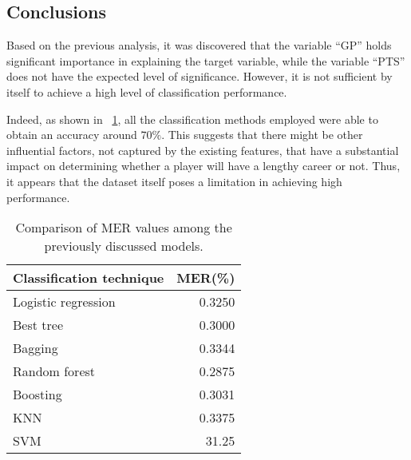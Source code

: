 \subsection{Conclusions}

Based on the previous analysis, it was discovered that the variable ``GP'' holds significant importance in explaining the target variable, while the variable ``PTS'' does not have the expected level of significance. 
However, it is not sufficient by itself to achieve a high level of classification performance.

Indeed, as shown in \Tab~\ref{table:ClasEvalParams}, all the classification methods employed were able to obtain an accuracy around $70\%$. This suggests that there might be other influential factors, not captured by the existing features, that have a substantial impact on determining whether a player will have a lengthy career or not. Thus, it appears that the dataset itself poses a limitation in achieving high performance.

\begin{table}[H]
	\centering
	\begin{tabular}{|| l | r ||} 
		\hline
		Classification technique & MER(\%) \\
		\hline
		Logistic regression & 0.3250 \\
		\hline
		Best tree & 0.3000 \\
		\hline
		Bagging & 0.3344 \\
		\hline
		Random forest & 0.2875 \\
		\hline
		Boosting & 0.3031 \\
		\hline
		KNN & 0.3375 \\
		\hline
		SVM & 31.25 \\
		\hline
	\end{tabular}
	\caption{Comparison of MER values among the previously discussed models.}
	\label{table:ClasEvalParams}
\end{table}

